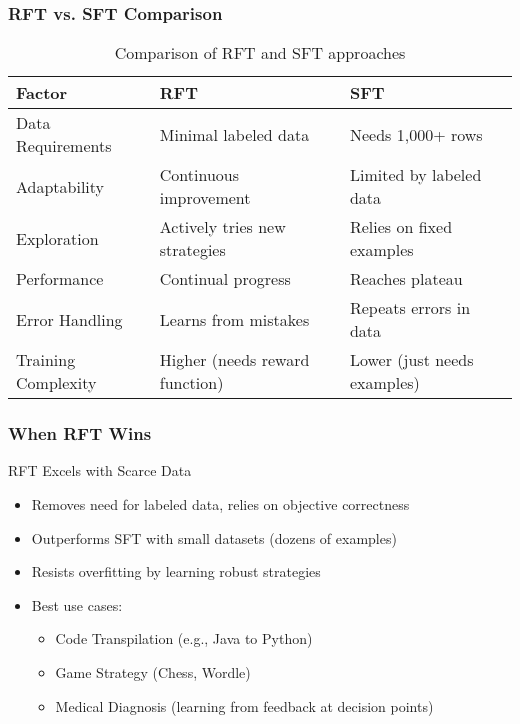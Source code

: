 \documentclass[aspectratio=169]{beamer}
\begin{document}
\begin{frame}
	\frametitle{RFT vs. SFT Comparison}
	\begin{table}
		\centering
		\begin{tabular}{|l|l|l|}
			\hline
			\textbf{Factor} & \textbf{RFT} & \textbf{SFT} \\
			\hline
			Data Requirements & Minimal labeled data & Needs 1,000+ rows \\
			\hline
			Adaptability & Continuous improvement & Limited by labeled data \\
			\hline
			Exploration & Actively tries new strategies & Relies on fixed examples \\
			\hline
			Performance & Continual progress & Reaches plateau \\
			\hline
			Error Handling & Learns from mistakes & Repeats errors in data \\
			\hline
			Training Complexity & Higher (needs reward function) & Lower (just needs examples) \\
			\hline
		\end{tabular}
		\caption{Comparison of RFT and SFT approaches}
	\end{table}
\end{frame}

\begin{frame}
	\frametitle{When RFT Wins}
	\begin{block}{RFT Excels with Scarce Data}
		\begin{itemize}
			\item Removes need for labeled data, relies on objective correctness
			\item Outperforms SFT with small datasets (dozens of examples)
			\item Resists overfitting by learning robust strategies
			\item Best use cases:
			\begin{itemize}
				\item Code Transpilation (e.g., Java to Python)
				\item Game Strategy (Chess, Wordle)
				\item Medical Diagnosis (learning from feedback at decision points)
			\end{itemize}
		\end{itemize}
	\end{block}
\end{frame}
\end{document}
